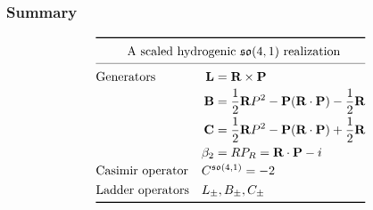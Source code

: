 \documentclass[12pt,a4paper]{report}
\theoremstyle{definition}
\theoremstyle{remark}
\theoremstyle{remark}
\begin{document}
\subsubsection{Summary}
\begin{equation*}
\def\arraystretch{1.3}
\begin{array}{@{}ll@{}}
\toprule
 \multicolumn{2}{c@{}}{\text{A scaled hydrogenic }\mathfrak{so}(4,1) \text{ realization}} \\
\cmidrule{1-2}
 \text{Generators} & \begin{aligned}[t]
  \textbf{L}&=\textbf{R}\times\textbf{P}\\
\textbf{B}&=\frac{1}{2}\textbf{R}P^2-\textbf{P}(\textbf{R}\cdot\textbf{P})-\frac{1}{2}\textbf{R}\\
\textbf{C}&=\frac{1}{2}\textbf{R}P^2-\textbf{P}(\textbf{R}\cdot\textbf{P})+\frac{1}{2}\textbf{R}\\
\beta_2&=RP_R=\textbf{R}\cdot\textbf{P}-i
  \end{aligned}\\
 \text{Casimir operator} & C^{\mathfrak{so}(4,1)}=-2\\
\text{Ladder operators} & L_\pm,B_\pm,C_\pm\\
\bottomrule
\end{array}
\end{equation*}
\end{document}
